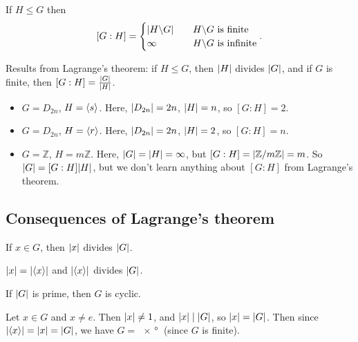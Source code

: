 \documentclass[12pt,letterpaper]{report}
\begin{document}
\begin{cor}{}{}
  If $H \leq G$ then
  \[
    [G : H] = \begin{cases}
      \lvert H \backslash G\rvert \quad & H \backslash G \text{ is finite} \\
      \infty & H \backslash G \text{ is infinite}
    \end{cases}.
  \]
\end{cor}

Results from Lagrange's theorem: if $H \leq G$, then $\lvert H\rvert$ divides $\lvert G\rvert$, and if $G$ is
finite, then $[G : H] = \frac{\lvert G\rvert}{\lvert H\rvert}$.

\begin{ex}
  \begin{itemize}
    \item $G = D_{2n}$, $H = \langle s\rangle$.
    Here, $\lvert D_{2n}\rvert = 2n$, $\lvert H\rvert = n$, so $[G : H] = 2$.
    \item $G = D_{2n}$, $H = \langle r\rangle$.
    Here, $\lvert D_{2n}\rvert = 2n$, $\lvert H\rvert = 2$, so $[G : H] = n$.
    \item $G = \mathbb{Z}$, $H = m\mathbb{Z}$.
    Here, $\lvert G\rvert = \lvert H\rvert = \infty$, but $[G : H] = \lvert\mathbb{Z}/{m}\mathbb{Z}\rvert = m$.
    So $\lvert G\rvert = [G : H] \lvert H\rvert$, but we don't learn anything about $[G : H]$ from Lagrange's
    theorem.
  \end{itemize}
\end{ex}

\pagebreak
\subsection{Consequences of Lagrange's theorem}

\begin{cor}{}{}
  If $x \in G$, then $\lvert x\rvert$ divides $\lvert G\rvert$.
\end{cor}

\begin{thmproof}
  $\lvert x\rvert = \lvert\langle x\rangle\rvert$ and $\lvert\langle x\rangle\rvert$ divides $\lvert G\rvert$.
\end{thmproof}

\begin{prop}{}{}
  If $\lvert G\rvert$ is prime, then $G$ is cyclic.
\end{prop}

\begin{thmproof}
  Let $x \in G$ and $x \neq e$.
  Then $\lvert x\rvert \neq 1$, and $\lvert x\rvert \mid \lvert G\rvert$, so $\lvert x\rvert = \lvert G\rvert$.
  Then since $\lvert\langle x\rangle\rvert = \lvert x\rvert = \lvert G\rvert$, we have $G = \ang{x}$ (since $G$ is finite).
\end{thmproof}
\end{document}
